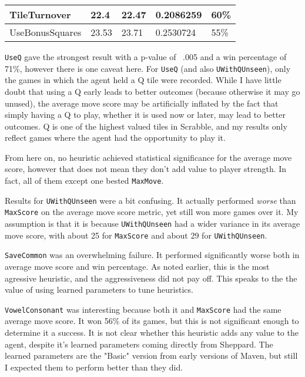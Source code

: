 \documentclass[letterpaper]{article}
\begin{document}
\begin{table}[h]
\begin{tabular}{|l|l|l|l|l|}
TileTurnover    & 22.4                                                          & 22.47                                                            & 0.2086259        & 60\%                                                               \\ \hline
UseBonusSquares & 23.53                                                         & 23.71                                                            & 0.2530724        & 55\%                                                               \\ \hline
\end{tabular}
\end{table}

\texttt{UseQ} gave the strongest result with a p-value of ~.005 and a win percentage of 71\%, however there is one caveat here. For \texttt{UseQ} (and also \texttt{UWithQUnseen}), only the games in which the agent held a Q tile were recorded. While I have little doubt that using a Q early leads to better outcomes (because otherwise it may go unused), the average move score may be artificially inflated by the fact that simply having a Q to play, whether it is used now or later,  may lead to better outcomes. Q is one of the highest valued tiles in Scrabble, and my results only reflect games where the agent had the opportunity to play it.

From here on, no heuristic achieved statistical significance for the average move score, however that does not mean they don't add value to player strength. In fact, all of them except one bested \texttt{MaxMove}.

Results for \texttt{UWithQUnseen} were a bit confusing. It actually performed \emph{worse} than \texttt{MaxScore} on the average move score metric, yet still won more games over it. My assumption is that it is because \texttt{UWithQUnseen} had a wider variance in its average move score, with about 25 for \texttt{MaxScore} and about 29 for \texttt{UWithQUnseen}.

\texttt{SaveCommon} was an overwhelming failure. It performed significantly worse both in average move score and win percentage. As noted earlier, this is the most agressive heuristic, and the aggressiveness did not pay off. This speaks to the the value of using learned parameters to tune heuristics.

\texttt{VowelConsonant} was interesting because both it and \texttt{MaxScore} had the same average move score. It won 56\% of its games, but this is not significant enough to determine it a success. It is not clear whether this heuristic adds any value to the agent, despite it's learned parameters coming directly from Sheppard. The learned parameters are the "Basic" version from early versions of Maven, but still I expected them to perform better than they did.
\end{document}
